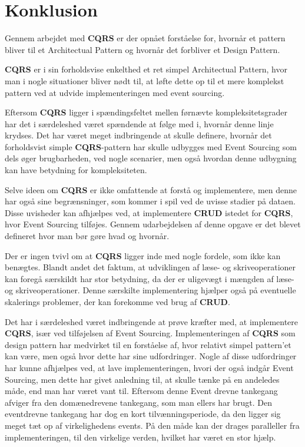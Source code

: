 \chapter{Konklusion}
Gennem arbejdet med \textbf{CQRS} er der opnået forståelse for, hvornår et pattern bliver til et Architectual Pattern og hvornår det forbliver et Design Pattern.

\textbf{CQRS} er i sin forholdsvise enkelthed et ret simpel Architectual Pattern, hvor man i nogle situationer bliver nødt til, at løfte dette op til et mere komplekst pattern ved at udvide implementeringen med event sourcing.\newline

Eftersom \textbf{CQRS} ligger i spændingsfeltet mellen førnævte kompleksitetsgrader har det i særdeleshed været spændende at følge med i, hvornår denne linje krydses. Det har været meget indbringende at skulle definere, hvornår det forholdsvist simple \textbf{CQRS}-pattern har skulle udbygges med Event Sourcing som dels øger brugbarheden, ved nogle scenarier, men også hvordan denne udbygning kan have betydning for kompleksiteten.\newline

Selve ideen om \textbf{CQRS} er ikke omfattende at forstå og implementere, men denne har også sine begrænsninger, som kommer i spil ved de uvisse stadier på dataen. Disse uvisheder kan afhjælpes ved, at implementere \textbf{CRUD} istedet for \textbf{CQRS}, hvor Event Sourcing tilføjes. Gennem udarbejdelsen af denne opgave er det blevet defineret hvor man bør gøre hvad og hvornår. \newline

Der er ingen tvivl om at \textbf{CQRS} ligger inde med nogle fordele, som ikke kan benægtes. Blandt andet det faktum, at udviklingen af læse- og skriveoperationer kan foregå særskildt har stor betydning, da der er uligevægt i mængden af læse- og skriveoperationer. Denne særskilte implementering hjælper også på eventuelle skalerings problemer, der kan forekomme ved brug af \textbf{CRUD}.\newline 

Det har i særdeleshed været indbringende at prøve kræfter med, at implementere \textbf{CQRS}, især ved tilføjelsen af Event Sourcing. Implementeringen af \textbf{CQRS} som design pattern har medvirket til en forståelse af, hvor relativt simpel pattern'et kan være, men også hvor dette har sine udfordringer. Nogle af disse udfordringer har kunne afhjælpes ved, at lave implementeringen, hvori der også indgår Event Sourcing, men dette har givet anledning til, at skulle tænke på en andeledes måde, end man har været vant til. Eftersom denne Event drevne tankegang afviger fra den domænedrevene tankegang, som man ellers har brugt. 
Den eventdrevne tankegang har dog en kort tilvænningsperiode, da den ligger sig meget tæt op af virkelighedens events. På den måde kan der drages paralleller fra implementeringen, til den virkelige verden, hvilket har været en stor hjælp. 
